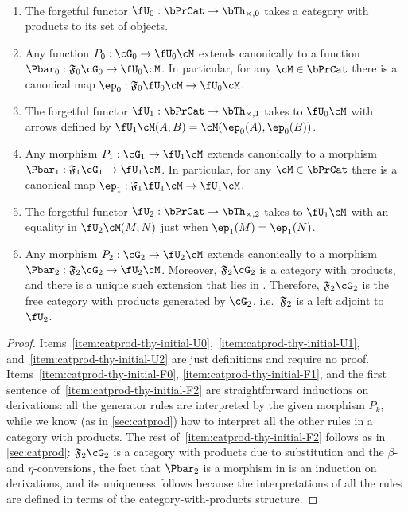 \begin{defnthm}\label{thm:catprod-thy-initial}\ 
  \begin{enumerate}
  \item The forgetful functor $\fU_0 : \bPrCat \to \timesthy0$ takes a category with products to its set of objects.\label{item:catprod-thy-initial-U0}
  \item Any function $P_0:\cG_0 \to \fU_0\cM$ extends canonically to a function $\Pbar_0:\F{0}\cG_0\to \fU_0\cM$.
    In particular, for any $\cM\in\bPrCat$ there is a canonical map $\ep_0:\F{0}\fU_0\cM\to \fU_0\cM$.\label{item:catprod-thy-initial-F0}
  \item The forgetful functor $\fU_1 : \bPrCat \to \timesthy1$ takes \cM to $\fU_0\cM$ with arrows defined by $\fU_1\cM(A,B) = \cM(\ep_0(A),\ep_0(B))$.\label{item:catprod-thy-initial-U1}
  \item Any morphism $P_1:\cG_1 \to \fU_1\cM$ extends canonically to a morphism $\Pbar_1 : \F{1}\cG_1 \to \fU_1\cM$.
    In particular, for any $\cM\in\bPrCat$ there is a canonical map $\ep_1:\F{1}\fU_1\cM\to \fU_1\cM$.\label{item:catprod-thy-initial-F1}
  \item The forgetful functor $\fU_2 : \bPrCat \to \timesthy2$ takes \cM to $\fU_1\cM$ with an equality in $\fU_2\cM(M,N)$ just when $\ep_1(M)=\ep_1(N)$.\label{item:catprod-thy-initial-U2}
  \item Any morphism $P_2:\cG_2 \to \fU_2\cM$ extends canonically to a morphism $\Pbar_2 : \F{2}\cG_2 \to \fU_2\cM$.
    Moreover, $\F{2}\cG_2$ is a category with products, and there is a unique such extension that lies in \bPrCat.
    Therefore, $\F{2}\cG_2$ is the free category with products generated by $\cG_2$, i.e.\ $\mathfrak{F}_{2}$ is a left adjoint to $\fU_2$.\label{item:catprod-thy-initial-F2}
  \end{enumerate}
\end{defnthm}
\begin{proof}
  Items~\ref{item:catprod-thy-initial-U0},~\ref{item:catprod-thy-initial-U1}, and~\ref{item:catprod-thy-initial-U2} are just definitions and require no proof.
  Items~\ref{item:catprod-thy-initial-F0}, \ref{item:catprod-thy-initial-F1}, and the first sentence of~\ref{item:catprod-thy-initial-F2} are straightforward inductions on derivations: all the generator rules are interpreted by the given morphism $P_k$, while we know (as in \cref{sec:catprod}) how to interpret all the other rules in a category with products.
  The rest of~\ref{item:catprod-thy-initial-F2} follows as in \cref{sec:catprod}: $\F{2}\cG_2$ is a category with products due to substitution and the $\beta$- and $\eta$-conversions, the fact that $\Pbar_2$ is a morphism in \bPrCat is an induction on derivations, and its uniqueness follows because the interpretations of all the rules are defined in terms of the category-with-products structure.
\end{proof}


